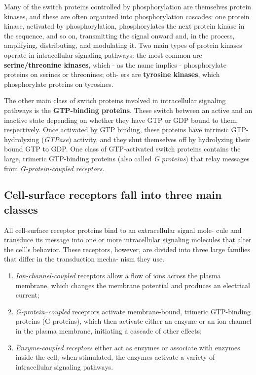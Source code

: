 Many of the switch proteins controlled by phosphorylation are themselves
protein kinases, and these are often organized into phosphorylation cascades:
one protein kinase, activated by phosphorylation, phosphorylates
the next protein kinase in the sequence, and so on, transmitting the signal
onward and, in the process, amplifying, distributing, and modulating
it. Two main types of protein kinases operate in intracellular signaling
pathways: the most common are \textbf{serine/threonine kinases}, which - as
the name implies - phosphorylate proteins on serines or threonines; oth-
ers are \textbf{tyrosine kinases}, which phosphorylate proteins on tyrosines.

The other main class of switch proteins involved in intracellular signaling
pathways is the \textbf{GTP-binding proteins}. These switch between an
active and an inactive state depending on whether they have GTP or
GDP bound to them, respectively. Once activated by GTP
binding, these proteins have intrinsic GTP-hydrolyzing (\textit{GTPase}) activity,
and they shut themselves off by hydrolyzing their bound GTP to GDP.
One class of GTP-activated switch proteins contains the large, trimeric
GTP-binding proteins (also called \textit{G proteins}) that relay messages from
\textit{G-protein-coupled receptors}.

\subsection{Cell-surface receptors fall into three main classes}

All cell-surface receptor proteins bind to an extracellular signal mole-
cule and transduce its message into one or more intracellular signaling
molecules that alter the cell’s behavior. These receptors, however, are
divided into three large families that differ in the transduction mecha-
nism they use.

\begin{enumerate}
\item \textit{Ion-channel-coupled} receptors allow a flow of ions
across the plasma membrane, which changes the membrane potential
and produces an electrical current;
\item \textit{G-protein–coupled} receptors activate membrane-bound, trimeric GTP-binding proteins (G
proteins), which then activate either an enzyme or an ion channel in the
plasma membrane, initiating a cascade of other effects;
\item \textit{Enzyme-coupled receptors} either act as enzymes or associate with
enzymes inside the cell; when stimulated, the enzymes
activate a variety of intracellular signaling pathways.
\end{enumerate}

